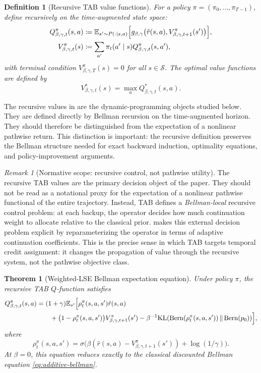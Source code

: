 \documentclass{article}
\newtheorem{theorem}{Theorem}[section]
\newtheorem{definition}[definition]{Definition}
\theoremstyle{remark}
\newtheorem{remark}[remark]{Remark}
\DeclareMathOperator{\Bern}{Bern}
\newcommand{\E}{\mathbb{E}}
\newcommand{\KL}{\mathrm{KL}}
\newcommand{\defeq}{\coloneqq}
\newcommand{\cS}{\mathcal{S}}
\newcommand{\gbg}{g_{\beta,\gamma}}
\newcommand{\pprior}{p_0}
\newcommand{\KLbin}[2]{\KL\!\left(\Bern(#1)\,\middle\|\,\Bern(#2)\right)}
\begin{document}
\begin{definition}[Recursive TAB value functions]
\label{def:lse-value}
For a policy $\pi=(\pi_0,\dots,\pi_{T-1})$, define recursively on the time-augmented state space:
\begin{align}
Q_{\beta,\gamma,t}^\pi(s,a)
&\defeq
\E_{s'\sim P(\cdot\mid s,a)}
\Bigl[
\gbg\bigl(\hat r(s,a),V_{\beta,\gamma,t+1}^\pi(s')\bigr)
\Bigr],
\label{eq:lse-q-pi}\\
V_{\beta,\gamma,t}^\pi(s)
&\defeq
\sum_{a'}\pi_t(a'\mid s)Q_{\beta,\gamma,t}^\pi(s,a'),
\label{eq:lse-v-pi}
\end{align}
with terminal condition $V_{\beta,\gamma,T}^\pi(s)=0$ for all $s\in\cS$.
The optimal value functions are defined by
\[
V^*_{\beta,\gamma,t}(s)=\max_a Q^*_{\beta,\gamma,t}(s,a).
\]
\end{definition}

The recursive values in  are the dynamic-programming objects studied below.
They are defined directly by Bellman recursion on the time-augmented horizon. They should therefore
be distinguished from the expectation of a nonlinear pathwise return. This distinction is important:
the recursive definition preserves the Bellman structure needed for exact backward induction,
optimality equations, and policy-improvement arguments.


\begin{remark}[Normative scope: recursive control, not pathwise utility]
\label{rem:recursive-scope}
The recursive TAB values are the primary decision object of the paper. They should not be read as a notational proxy for the expectation of a nonlinear pathwise functional of the entire trajectory. Instead, TAB defines a \emph{Bellman-local} recursive control problem: at each backup, the operator decides how much continuation weight to allocate relative to the classical prior.  makes this external decision problem explicit by reparameterizing the operator in terms of adaptive continuation coefficients. This is the precise sense in which TAB targets temporal credit assignment: it changes the propagation of value through the recursive system, not the pathwise objective class.
\end{remark}

\begin{theorem}[Weighted-LSE Bellman expectation equation]
\label{thm:lse-bellman-expectation}
Under policy $\pi$, the recursive TAB $Q$-function satisfies
\begin{equation}
\begin{aligned}
Q_{\beta,\gamma,t}^\pi(s,a)
&=
(1+\gamma)
\E_{s'}\Bigl[
\rho_{t}^{\pi}(s,a,s')\hat r(s,a) \\
&\qquad+
\bigl(1-\rho_{t}^{\pi}(s,a,s')\bigr)
V_{\beta,\gamma,t+1}^\pi(s')
-
\beta^{-1}\KLbin{\rho_t^{\pi}(s,a,s')}{\pprior}
\Bigr],
\end{aligned}
\label{eq:lse-bellman-exp}
\end{equation}
where
\[
\rho_t^{\pi}(s,a,s')
=
\sigma\!\bigl(
\beta(\hat r(s,a)-V_{\beta,\gamma,t+1}^\pi(s'))
+\log(1/\gamma)
\bigr).
\]
At $\beta=0$, this equation reduces exactly to the classical discounted Bellman equation
\eqref{eq:additive-bellman}.
\end{theorem}
\end{document}
